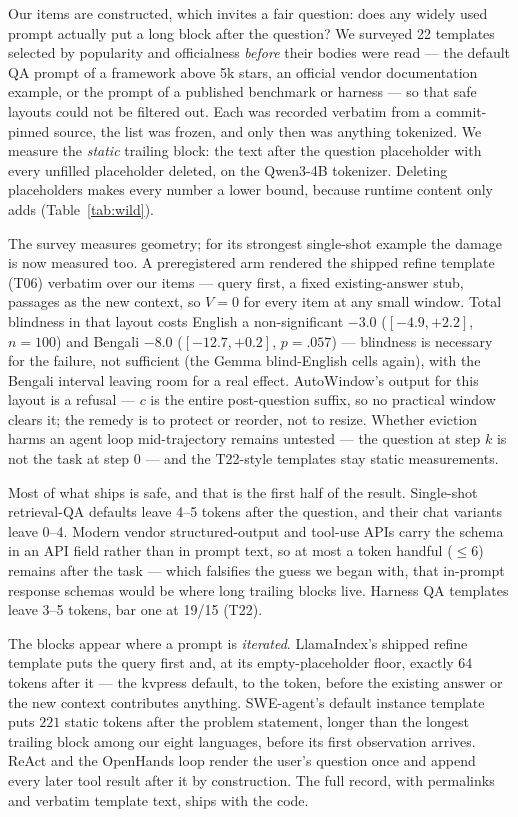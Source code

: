 \documentclass{article}
\begin{document}
Our items are constructed, which invites a fair question: does any widely
used prompt actually put a long block after the question? We surveyed 22
templates selected by popularity and officialness \emph{before} their
bodies were read --- the default QA prompt of a framework above 5k stars,
an official vendor documentation example, or the prompt of a published
benchmark or harness --- so that safe layouts could not be filtered out.
Each was recorded verbatim from a commit-pinned source, the list was
frozen, and only then was anything tokenized. We measure the
\emph{static} trailing block: the text after the question placeholder
with every unfilled placeholder deleted, on the Qwen3-4B tokenizer.
Deleting placeholders makes every number a lower bound, because runtime
content only adds (Table~\ref{tab:wild}).

The survey measures geometry; for its strongest single-shot example
the damage is now measured too. A preregistered arm rendered the
shipped refine template (T06) verbatim over our items --- query
first, a fixed existing-answer stub, passages as the new context, so
$V{=}0$ for every item at any small window. Total blindness in that
layout costs English a non-significant $-3.0$ ($[-4.9,+2.2]$,
$n{=}100$) and Bengali $-8.0$ ($[-12.7,+0.2]$, $p{=}.057$) ---
blindness is necessary for the failure, not sufficient (the Gemma
blind-English cells again), with the Bengali interval leaving room
for a real effect. AutoWindow's output for this layout is a refusal
--- $c$ is the entire post-question suffix, so no practical window
clears it; the remedy is to protect or reorder, not to resize.
Whether eviction harms an agent loop mid-trajectory remains untested
--- the question at step $k$ is not the task at step $0$ --- and the
T22-style templates stay static measurements.

Most of what ships is safe, and that is the first half of the result.
Single-shot retrieval-QA defaults leave 4--5 tokens after the question,
and their chat variants leave 0--4. Modern vendor structured-output and
tool-use APIs carry the schema in an API field rather than in prompt
text, so at most a token handful ($\le 6$) remains after the task --- which falsifies the
guess we began with, that in-prompt response schemas would be where long
trailing blocks live. Harness QA templates leave 3--5 tokens, bar one at 19/15 (T22).

The blocks appear where a prompt is \emph{iterated}. LlamaIndex's shipped
refine template puts the query first and, at its empty-placeholder floor,
exactly $64$ tokens after it --- the kvpress default, to the token,
before the existing answer or the new context contributes anything.
SWE-agent's default instance template puts $221$ static tokens after the
problem statement, longer than the longest trailing block among our eight
languages, before its first observation arrives. ReAct and the OpenHands
loop render the user's question once and append every later tool result
after it by construction. The full record, with permalinks and verbatim
template text, ships with the code.
\end{document}
